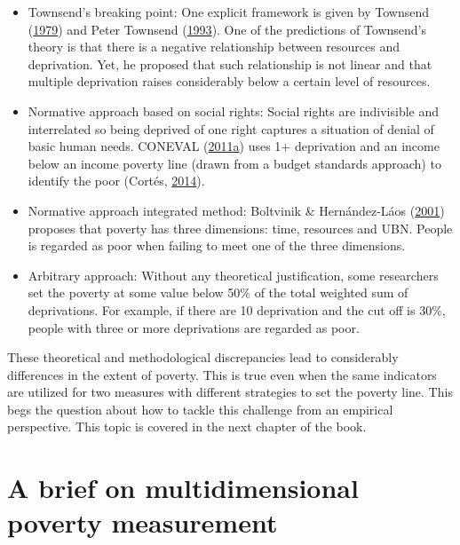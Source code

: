\documentclass[]{book}
\providecommand{\tightlist}{%
  \setlength{\itemsep}{0pt}\setlength{\parskip}{0pt}}
\begin{document}
\begin{itemize}
\tightlist
\item
  Townsend's breaking point: One explicit framework is given by Townsend (\protect\hyperlink{ref-Townsend1979}{1979}) and Peter Townsend (\protect\hyperlink{ref-Townsend1993}{1993}). One of the predictions of Townsend's theory is that there is a negative relationship between resources and deprivation. Yet, he proposed that such relationship is not linear and that multiple deprivation raises considerably below a certain level of resources.
\item
  Normative approach based on social rights: Social rights are indivisible and interrelated so being deprived of one right captures a situation of denial of basic human needs. CONEVAL (\protect\hyperlink{ref-CONEVAL2011a}{2011}\protect\hyperlink{ref-CONEVAL2011a}{a}) uses 1+ deprivation and an income below an income poverty line (drawn from a budget standards approach) to identify the poor (Cortés, \protect\hyperlink{ref-Cortes2014}{2014}).
\item
  Normative approach integrated method: Boltvinik \& Hernández-Láos (\protect\hyperlink{ref-Boltvinik2001}{2001}) proposes that poverty has three dimensions: time, resources and UBN. People is regarded as poor when failing to meet one of the three dimensions.
\item
  Arbitrary approach: Without any theoretical justification, some researchers set the poverty at some value below 50\% of the total weighted sum of deprivations. For example, if there are 10 deprivation and the cut off is 30\%, people with three or more deprivations are regarded as poor.
\end{itemize}

These theoretical and methodological discrepancies lead to considerably differences in the extent of poverty. This is true even when the same indicators are utilized for two measures with different strategies to set the poverty line. This begs the question about how to tackle this challenge from an empirical perspective. This topic is covered in the next chapter of the book.

\hypertarget{a-brief-on-multidimensional-poverty-measurement}{%
\section{A brief on multidimensional poverty measurement}\label{a-brief-on-multidimensional-poverty-measurement}}
\end{document}
